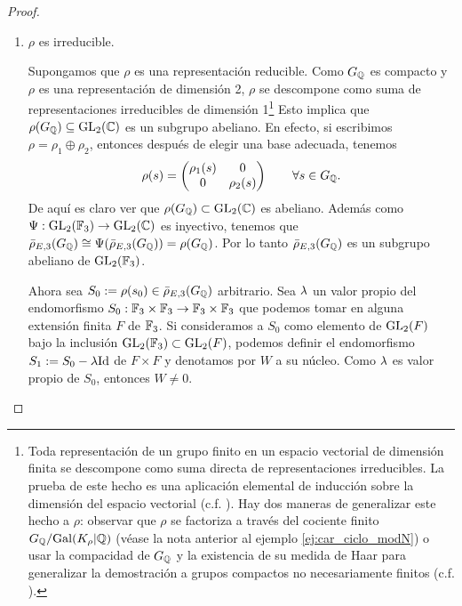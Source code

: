 \begin{proof}
\begin{enumerate}[label=\emph{\roman*})]
  \item $\rho$ es irreducible.

    \-\;\; Supongamos que $\rho$ es una representaci\'on reducible. Como $G_{\mathbb{Q}}$ es compacto y $\rho$ es una representaci\'on de dimensi\'on 2, $\rho$ se descompone como suma de representaciones irreducibles de dimensi\'on 1\footnote{Toda representaci\'on de un grupo finito en un espacio vectorial de dimensi\'on finita se descompone como suma directa de representaciones irreducibles. La prueba de este hecho es una aplicaci\'on elemental de inducci\'on sobre la dimensi\'on del espacio vectorial (c.f. \cite[\S1.4]{SerreLROFG}). Hay dos maneras de generalizar este hecho a $\rho$: observar que $\rho$ se factoriza a trav\'es del cociente finito $G_{\mathbb{Q}}/\mathrm{Gal}(K_{\rho}|\mathbb{Q})$ (v\'ease la nota anterior al ejemplo \ref{ej:car_ciclo_modN}) o usar la compacidad de $G_{\mathbb{Q}}$ y la existencia de su medida de Haar para generalizar la demostraci\'on a grupos compactos no necesariamente finitos (c.f. \cite[\S4.3]{SerreLROFG}).} Esto implica que $\rho(G_{\mathbb{Q}})\subseteq\mathrm{GL}_2(\mathbb{C})$ es un subgrupo abeliano. En efecto, si escribimos $\rho=\rho_1\oplus\rho_2$, entonces despu\'es de elegir una base adecuada, tenemos
    \[
      \rho(s)=\begin{pmatrix}\rho_1(s) & 0\\ 0 & \rho_2(s)\end{pmatrix}\qquad\forall s\in G_{\mathbb{Q}}.
    \]
De aqu\'i es claro ver que $\rho(G_{\mathbb{Q}})\subset\mathrm{GL}_2(\mathbb{C})$ es abeliano. Adem\'as como $\Psi:\mathrm{GL}_2(\mathbb{F}_3)\rightarrow\mathrm{GL}_2(\mathbb{C})$ es inyectivo, tenemos que $\bar{\rho}_{E,3}(G_{\mathbb{Q}})\cong\Psi(\bar{\rho}_{E,3}(G_{\mathbb{Q}}))=\rho(G_{\mathbb{Q}})$. Por lo tanto $\bar{\rho}_{E,3}(G_{\mathbb{Q}})$ es un subgrupo abeliano de $\mathrm{GL}_2(\mathbb{F}_3)$.


\-\;\; Ahora sea $S_0:=\rho(s_0)\in\bar{\rho}_{E,3}(G_{\mathbb{Q}})$ arbitrario. Sea $\lambda$ un valor propio del endomorfismo $S_0:\mathbb{F}_3\times\mathbb{F}_3\rightarrow\mathbb{F}_3\times\mathbb{F}_3$ que podemos tomar en alguna extensi\'on finita $F$ de $\mathbb{F}_3$. Si consideramos a $S_0$ como elemento de $\mathrm{GL}_2(F)$ bajo la inclusi\'on $\mathrm{GL}_2(\mathbb{F}_3)\subset\mathrm{GL}_2(F)$, podemos definir el endomorfismo $S_1:=S_0-\lambda\mathrm{Id}$ de $F\times F$ y denotamos por $W$ a su n\'ucleo. Como $\lambda$ es valor propio de $S_0$, entonces $W\neq0$.


\end{enumerate}
\end{proof}
